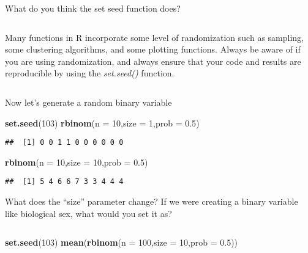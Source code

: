 \documentclass[
]{article}
\newenvironment{Shaded}{\begin{snugshade}}{\end{snugshade}}
\newcommand{\AttributeTok}[1]{\textcolor[rgb]{0.13,0.29,0.53}{#1}}
\newcommand{\DecValTok}[1]{\textcolor[rgb]{0.00,0.00,0.81}{#1}}
\newcommand{\FloatTok}[1]{\textcolor[rgb]{0.00,0.00,0.81}{#1}}
\newcommand{\FunctionTok}[1]{\textcolor[rgb]{0.13,0.29,0.53}{\textbf{#1}}}
\newcommand{\NormalTok}[1]{#1}
\begin{document}
What do you think the set seed function does?

\(~\)

Many functions in R incorporate some level of randomization such as
sampling, some clustering algorithms, and some plotting functions.
Always be aware of if you are using randomization, and always ensure
that your code and results are reproducible by using the
\emph{set.seed()} function.

\(~\)

Now let's generate a random binary variable

\begin{Shaded}
\begin{Highlighting}[]
\FunctionTok{set.seed}\NormalTok{(}\DecValTok{103}\NormalTok{)}
\FunctionTok{rbinom}\NormalTok{(}\AttributeTok{n =} \DecValTok{10}\NormalTok{,}\AttributeTok{size =} \DecValTok{1}\NormalTok{,}\AttributeTok{prob =} \FloatTok{0.5}\NormalTok{)}
\end{Highlighting}
\end{Shaded}

\begin{verbatim}
##  [1] 0 0 1 1 0 0 0 0 0 0
\end{verbatim}

\begin{Shaded}
\begin{Highlighting}[]
\FunctionTok{rbinom}\NormalTok{(}\AttributeTok{n =} \DecValTok{10}\NormalTok{,}\AttributeTok{size =} \DecValTok{10}\NormalTok{,}\AttributeTok{prob =} \FloatTok{0.5}\NormalTok{)}
\end{Highlighting}
\end{Shaded}

\begin{verbatim}
##  [1] 5 4 6 6 7 3 3 4 4 4
\end{verbatim}

What does the ``size'' parameter change? If we were creating a binary
variable like biological sex, what would you set it as?

\(~\)

\begin{Shaded}
\begin{Highlighting}[]
\FunctionTok{set.seed}\NormalTok{(}\DecValTok{103}\NormalTok{)}
\FunctionTok{mean}\NormalTok{(}\FunctionTok{rbinom}\NormalTok{(}\AttributeTok{n =} \DecValTok{100}\NormalTok{,}\AttributeTok{size =} \DecValTok{10}\NormalTok{,}\AttributeTok{prob =} \FloatTok{0.5}\NormalTok{))}
\end{Highlighting}
\end{Shaded}
\end{document}
